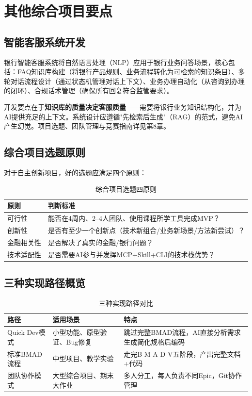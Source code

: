\section{其他综合项目要点}

\subsection{智能客服系统开发}

银行智能客服系统将自然语言处理（NLP）应用于银行业务问答场景，核心包括：FAQ知识库构建（将银行产品规则、业务流程转化为可检索的知识条目）、多轮对话流程设计（通过状态机管理对话上下文）、业务办理自动化（从咨询到办理的闭环）、合规话术管理（确保所有回复符合监管要求）。

开发要点在于\textbf{知识库的质量决定客服质量}——需要将银行业务知识结构化，并为AI提供充足的上下文。系统设计应遵循"先检索后生成"（RAG）的范式，避免AI产生幻觉。项目选题、团队管理与竞赛指南详见第8章。

\subsection{综合项目选题原则}

对于自主创新项目，好的选题应满足四个原则：

\begin{table}[H]
\centering
\begin{tabular}{lp{10cm}}
\toprule
\textbf{原则} & \textbf{判断标准} \\
\midrule
可行性 & 能否在4周内、2--4人团队、使用课程所学工具完成MVP？ \\
创新性 & 是否有至少一个创新点（技术新组合/业务新场景/方法新尝试）？ \\
金融相关性 & 是否解决了真实的金融/银行问题？ \\
技术适配性 & 是否需要AI参与并发挥MCP+Skill+CLI的技术栈优势？ \\
\bottomrule
\end{tabular}
\caption{综合项目选题四原则}
\end{table}

\subsection{三种实现路径概览}

\begin{table}[H]
\centering
\begin{tabular}{llp{8cm}}
\toprule
\textbf{路径} & \textbf{适用场景} & \textbf{特点} \\
\midrule
Quick Dev模式 & 小型功能、原型验证、Bug修复 & 跳过完整BMAD流程，AI直接分析需求生成简化规格后编码 \\
标准BMAD流程 & 中型项目、教学实验 & 走完B-M-A-D-V五阶段，产出完整文档+代码 \\
团队协作模式 & 大型综合项目、期末大作业 & 多人分工，每人负责不同Epic，Git协作管理 \\
\bottomrule
\end{tabular}
\caption{三种实现路径对比}
\end{table}

